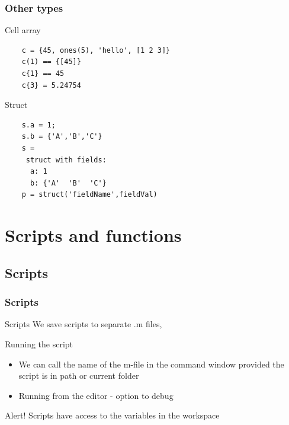 \documentclass{beamer}
\begin{document}
\begin{frame}[fragile]
\frametitle{Other types}   
  
  \begin{block}{Cell array}
    \begin{verbatim}
    c = {45, ones(5), 'hello', [1 2 3]}
    c(1) == {[45]}
    c{1} == 45
    c{3} = 5.24754 \end{verbatim}    
  \end{block}  
  
  \pause
  
  \begin{block}{Struct}
    \begin{verbatim}
    s.a = 1;
    s.b = {'A','B','C'}
    s = 
     struct with fields:
      a: 1
      b: {'A'  'B'  'C'}
    p = struct('fieldName',fieldVal) \end{verbatim}
  \end{block}  
\end{frame}

\section{Scripts and functions}

\subsection{Scripts}

\begin{frame}
\frametitle{Scripts}
  \begin{block}{Scripts}
    We save scripts to separate .m files,
  \end{block}
  
  \begin{block}{Running the script}
  \begin{itemize}
      \item We can call the name of the m-file in the command window provided the script is in path or current folder
      \item Running from the editor - option to debug
  \end{itemize}
  \end{block}
  
  \pause
  
  \begin{alertblock}{Alert!}
    Scripts have access to the variables in the workspace
  \end{alertblock}  
\end{frame}
    
\end{document}
